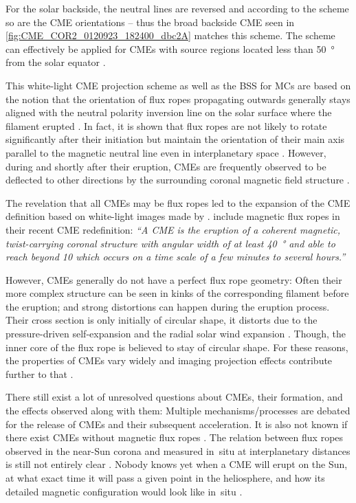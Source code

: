 For the solar backside, the neutral lines are reversed and according to the scheme so are the CME orientations -- thus the broad backside CME seen in \autoref{fig:CME_COR2_0120923_182400_dbc2A} matches this scheme. The scheme can effectively be applied for CMEs with source regions located less than \SI{50}{\degree} from the solar equator \citep{Webb2012}.

This white-light CME projection scheme as well as the BSS for MCs are based on the notion that the orientation of flux ropes propagating outwards generally stays aligned with the neutral polarity inversion line on the solar surface where the filament erupted \citep{Marubashi1997,Bothmer1998}. In fact, it is shown that flux ropes are not likely to rotate significantly after their initiation but maintain the orientation of their main axis parallel to the magnetic neutral line even in interplanetary space \citep{Marubashi2015}. However, during and shortly after their eruption, CMEs are frequently observed to be deflected to other directions by the surrounding coronal magnetic field structure \citep{Sterling2011}.

The revelation that all CMEs may be flux ropes \citep{Vourlidas2013,Marubashi2015} led to the expansion of the CME definition based on white-light images made by \citet{Hundhausen1984}. \citet{Vourlidas2013,Vourlidas2014} include magnetic flux ropes in their recent CME redefinition: \textit{``A CME is the eruption of a coherent magnetic, twist-carrying coronal structure with angular width of at least \SI{40}{\degree} and able to reach beyond \SI{10}{\Rs} which occurs on a time scale of a few minutes to several hours.''}

However, CMEs generally do not have a perfect flux rope geometry: Often their more complex structure can be seen in kinks of the corresponding filament before the eruption; and strong distortions can happen during the eruption process. Their cross section is only initially of circular shape, it distorts due to the pressure-driven self-expansion and the radial solar wind expansion \citep{Owens2006}. Though, the inner core of the flux rope is believed to stay of circular shape. For these reasons, the properties of CMEs vary widely and imaging projection effects contribute further to that \citep{Cremades2004}.

There still exist a lot of unresolved questions about CMEs, their formation, and the effects observed along with them: Multiple mechanisms/processes are debated for the release of CMEs and their subsequent acceleration. It is also not known if there exist CMEs without magnetic flux ropes \citep{Vourlidas2013}. The relation between flux ropes observed in the near-Sun corona and measured in~situ at interplanetary distances is still not entirely clear \citep{Vourlidas2014}. Nobody knows yet when a CME will erupt on the Sun, at what exact time it will pass a given point in the heliosphere, and how its detailed magnetic configuration would look like in~situ \citep{Gopalswamy2016}.\\


